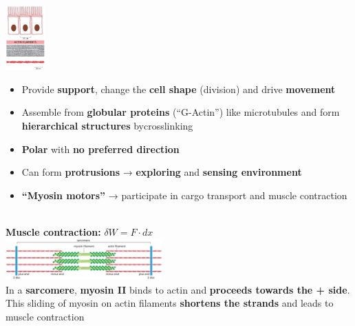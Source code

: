 \begin{minipage}{0.15\linewidth}
    \includegraphics[width=15mm]{src/Images/actin.png}
\end{minipage}
\begin{minipage}{0.85\linewidth}
\begin{itemize}
    \item Provide \textbf{support}, change the \textbf{cell shape} (division) and drive \textbf{movement}
    \item Assemble from \textbf{globular proteins} (“G-Actin”) like microtubules and form \textbf{hierarchical structures} bycrosslinking
    \item \textbf{Polar} with \textbf{no preferred direction}
    \item Can form \textbf{protrusions} → \textbf{exploring} and \textbf{sensing environment}
    \item \textbf{“Myosin motors”} → participate in cargo transport and muscle contraction
\end{itemize}
\end{minipage}\\

\textbf{Muscle contraction:} \hfill $\delta W = F \cdot d x$ \\
\includegraphics[width=60mm]{src/Images/muscle_contraction.png}\\
In a \textbf{sarcomere}, \textbf{myosin II} binds to actin and \textbf{proceeds towards the + side}.\\
This sliding of myosin on actin filaments \textbf{shortens the strands} and leads to muscle contraction
